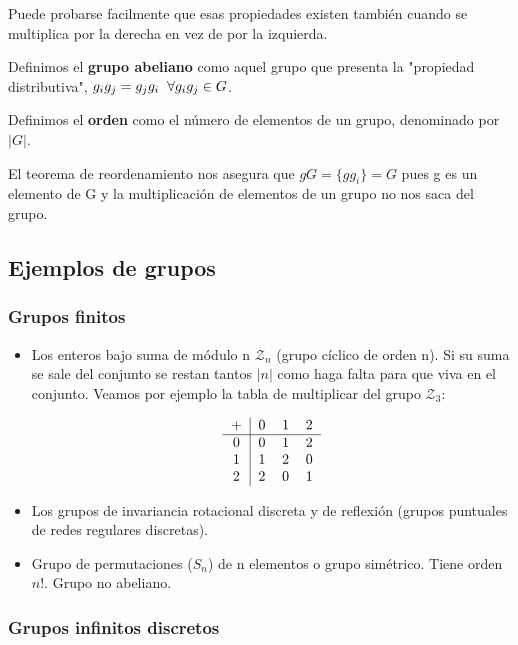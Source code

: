 \documentclass{article}
\begin{document}
Puede probarse facilmente que esas propiedades existen también cuando se multiplica por la derecha en vez de por la izquierda.

\smallskip
Definimos el \textbf{grupo abeliano} como aquel grupo que presenta la "propiedad distributiva", $g_ig_j=g_jg_i \hspace{0.2cm} \forall g_ig_j \in G$.

\smallskip
Definimos el \textbf{orden} como el número de elementos de un grupo, denominado por $|G|$.

\smallskip
El teorema de reordenamiento nos asegura que $gG=\lbrace gg_i\rbrace =G$ pues g es un elemento de G y la multiplicación de elementos de un grupo no nos saca del grupo.

\subsection{Ejemplos de grupos}

\subsubsection{Grupos finitos}

\begin{itemize}
    \item Los enteros bajo suma de módulo n $\mathcal{Z}_n$ (grupo cíclico de orden n). Si su suma se sale del conjunto se restan tantos $|n|$ como haga falta para que viva en el conjunto. Veamos por ejemplo la tabla de multiplicar del grupo $\mathcal{Z}_3$:

    $$\begin{tabular}[b]{ c | c c c }

+ & 0 & 1 & 2 \\
\hline
0  & 0 & 1 & 2 \\

1 & 1 & 2 & 0 \\

2 & 2 & 0 & 1

\end{tabular}
$$

    \item Los grupos de invariancia rotacional discreta y de reflexión (grupos puntuales de redes regulares discretas).
    \item Grupo de permutaciones ($S_n$) de n elementos o grupo simétrico. Tiene orden $n!$. Grupo no abeliano.
\end{itemize}

\subsubsection{Grupos infinitos discretos}
\end{document}
